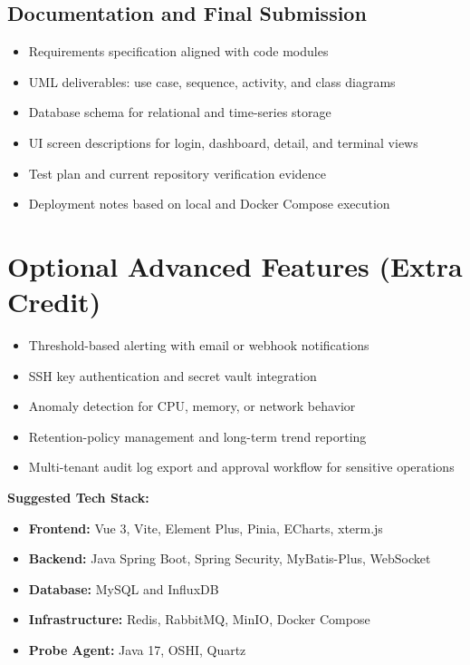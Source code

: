 \documentclass[11pt,a4paper]{article}
\begin{document}
\subsection*{Documentation and Final Submission}

\begin{itemize}
  \item Requirements specification aligned with code modules
  \item UML deliverables: use case, sequence, activity, and class diagrams
  \item Database schema for relational and time-series storage
  \item UI screen descriptions for login, dashboard, detail, and terminal views
  \item Test plan and current repository verification evidence
  \item Deployment notes based on local and Docker Compose execution
\end{itemize}

\section{Optional Advanced Features (Extra Credit)}

\begin{itemize}
  \item Threshold-based alerting with email or webhook notifications
  \item SSH key authentication and secret vault integration
  \item Anomaly detection for CPU, memory, or network behavior
  \item Retention-policy management and long-term trend reporting
  \item Multi-tenant audit log export and approval workflow for sensitive operations
\end{itemize}

\textbf{Suggested Tech Stack:}
\begin{itemize}
  \item \textbf{Frontend:} Vue 3, Vite, Element Plus, Pinia, ECharts, xterm.js
  \item \textbf{Backend:} Java Spring Boot, Spring Security, MyBatis-Plus, WebSocket
  \item \textbf{Database:} MySQL and InfluxDB
  \item \textbf{Infrastructure:} Redis, RabbitMQ, MinIO, Docker Compose
  \item \textbf{Probe Agent:} Java 17, OSHI, Quartz
\end{itemize}
\end{document}
